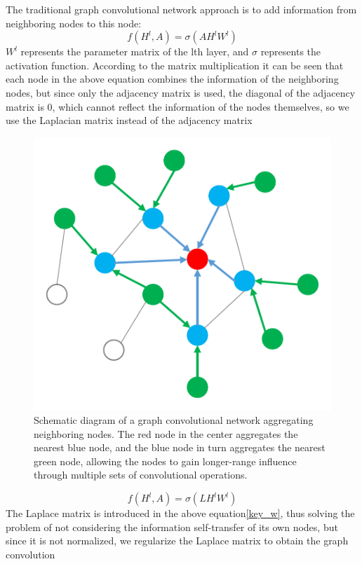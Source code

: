 \documentclass[%
reprint,
amsmath,amssymb,
aps,
]{revtex4-2}
\begin{document}
	The traditional graph convolutional network approach is to add information from neighboring nodes to this node:
	\begin{equation}\label{key}
		f(H^l,A) = \sigma(A H^l W^l)
	\end{equation}
	$W^l$ represents the parameter matrix of the lth layer, and $\sigma$ represents the activation function. According to the matrix multiplication it can be seen that each node in the above equation combines the information of the neighboring nodes, but since only the adjacency matrix is used, the diagonal of the adjacency matrix is 0, which cannot reflect the information of the nodes themselves, so we use the Laplacian matrix instead of the adjacency matrix
	\begin{figure}
		\centering
		\includegraphics[scale=0.5]{GNN}
		\caption{Schematic diagram of a graph convolutional network aggregating neighboring nodes. The red node in the center aggregates the nearest blue node, and the blue node in turn aggregates the nearest green node, allowing the nodes to gain longer-range influence through multiple sets of convolutional operations.}
		\label{fig:gnn}
	\end{figure}
	\begin{equation}\label{key_w}
		f(H^l,A) = \sigma(L H^l W^l)
	\end{equation}
	The Laplace matrix is introduced in the above equation\eqref{key_w}, thus solving the problem of not considering the information self-transfer of its own nodes, but since it is not normalized, we regularize the Laplace matrix to obtain the graph convolution
\end{document}

